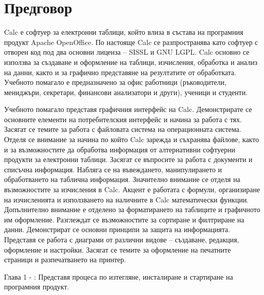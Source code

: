 \newpage
{}
\chapter*{Предговор}
\setcounter{page}{1}
\pagestyle{fancyplain}

Calc е софтуер за електронни таблици, който влиза в състава на програмния продукт Apache OpenOffice. По настояще Calc се разпространява като софтуер с отворен код под два основни лиценза – SISSL и GNU LGPL. Calc основно се използва за създаване и оформление на таблици, изчисления, обработка и анализ на данни, както и за графично представяне на резултатите от обработката. Учебното помагало е предназначено за офис работници (ръководители, мениджъри, секретари, финансови анализатори и други), ученици и студенти. 

Учебното помагало представя графичния интерфейс на Calc. Демонстрирате се основните елементи на потребителския интерфейс и начина за работа с тях. Засягат се темите за работа с файловата система на операционната система. Отделя се внимание за начина по който Calc зарежда и съхранява файлове, както и за възможностите да обработва информация от алтернативни софтуерни продукти за електронни таблици. Засягат се въпросите за работа с документи и списъчна информация. Набляга се на въвеждането, манипулирането и обработването на таблична информация. Значително внимание се отделя на възможностите за изчисления в Calc. Акцент е работата с формули, организиране на изчисленията и използването на наличните в Calc математически функции. Допълнително внимание е отделено за форматирането на таблиците и графичното им оформление. Разглеждат се възможностите за сортиране и филтриране на данни. Демонстрират се основни принципи за защита на информацията. Представя се работа с диаграми от различни видове – създаване, редакция, оформление и настройки. Засягат се темите за оформление на печатните страници и разпечатването на принтер. 

Глава 1 - : Представя процеса по изтегляне, инсталиране и стартиране на програмния продукт.
